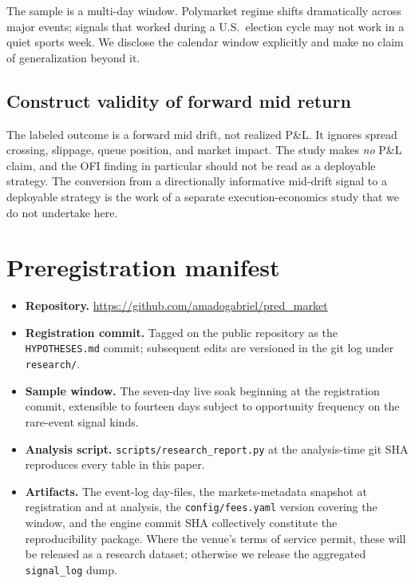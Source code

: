 \documentclass[review,12pt,authoryear]{elsarticle}
\begin{document}
The sample is a multi-day window. Polymarket regime shifts dramatically
across major events; signals that worked during a U.S.\ election cycle
may not work in a quiet sports week. We disclose the calendar window
explicitly and make no claim of generalization beyond it.

\subsection{Construct validity of forward mid return}

The labeled outcome is a forward mid drift, not realized P\&L. It ignores
spread crossing, slippage, queue position, and market impact. The study
makes \emph{no} P\&L claim, and the OFI finding in particular should not
be read as a deployable strategy. The conversion from a directionally
informative mid-drift signal to a deployable strategy is the work of a
separate execution-economics study that we do not undertake here.

\section{Preregistration manifest}
\label{sec:prereg}

\begin{itemize}[noitemsep]
\item \textbf{Repository.} \url{https://github.com/amadogabriel/pred_market}
\item \textbf{Registration commit.} Tagged on the public repository as the
\texttt{HYPOTHESES.md} commit; subsequent edits are versioned in the git
log under \texttt{research/}.
\item \textbf{Sample window.} The seven-day live soak beginning at the
registration commit, extensible to fourteen days subject to opportunity
frequency on the rare-event signal kinds.
\item \textbf{Analysis script.} \texttt{scripts/research\_report.py} at the
analysis-time git SHA reproduces every table in this paper.
\item \textbf{Artifacts.} The event-log day-files, the markets-metadata
snapshot at registration and at analysis, the \texttt{config/fees.yaml}
version covering the window, and the engine commit SHA collectively
constitute the reproducibility package. Where the venue's terms of service
permit, these will be released as a research dataset; otherwise we release
the aggregated \texttt{signal\_log} dump.
\end{itemize}
\end{document}

